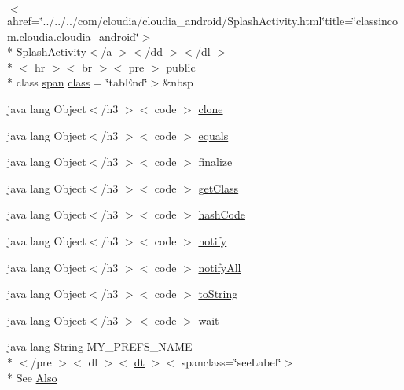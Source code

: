 \begin{DoxyCompactItemize}
$<$ ahref=\char`\"{}../../../com/cloudia/cloudia\-\_\-android/Splash\-Activity.\-html\char`\"{}title=\char`\"{}classincom.\-cloudia.\-cloudia\-\_\-android\char`\"{}$>$\\*
 Splash\-Activity$<$/\hyperlink{style_8css_a5e8981582017bb8b84c21f148345d1f7}{a} $>$$<$/\hyperlink{stylesheet_8css_a47f4718a86835a7771ec592ece845221}{dd} $>$$<$/dl $>$\\*
$<$ hr $>$$<$ br $>$$<$ pre $>$ public \\*
class \hyperlink{stylesheet_8css_a8343996ebcf16220b04e54659aac31cc}{span} \hyperlink{_base_activity_8html_a406f8791460e5753ea2317e76ea0546e}{class} = \char`\"{}tab\-End\char`\"{}$>$\&nbsp
\item 
java lang Object$<$/h3 $>$$<$ code $>$ \hyperlink{_base_activity_8html_adc9607fcabf6f2d7f401ad52015ef6e0}{clone}
\item 
java lang Object$<$/h3 $>$$<$ code $>$ \hyperlink{_base_activity_8html_a8974318cea585f72df717e0380ec7104}{equals}
\item 
java lang Object$<$/h3 $>$$<$ code $>$ \hyperlink{_base_activity_8html_ab2315181ead4aeedef2374039b6ddde7}{finalize}
\item 
java lang Object$<$/h3 $>$$<$ code $>$ \hyperlink{_base_activity_8html_a98e6644727fe65eac217a6855045be43}{get\-Class}
\item 
java lang Object$<$/h3 $>$$<$ code $>$ \hyperlink{_base_activity_8html_a8e178e2bb2bef055ea23ea3910a221ca}{hash\-Code}
\item 
java lang Object$<$/h3 $>$$<$ code $>$ \hyperlink{_base_activity_8html_ae99ae10b5010594dbda4794e02db271b}{notify}
\item 
java lang Object$<$/h3 $>$$<$ code $>$ \hyperlink{_base_activity_8html_a1279357e6e09e33e75b55eb05fdb6436}{notify\-All}
\item 
java lang Object$<$/h3 $>$$<$ code $>$ \hyperlink{_base_activity_8html_a36e8a76a4132c9a7081416f27d087615}{to\-String}
\item 
java lang Object$<$/h3 $>$$<$ code $>$ \hyperlink{_base_activity_8html_a9a9f0c22e5688d478c707f910f1c1aea}{wait}
\item 
java lang String M\-Y\-\_\-\-P\-R\-E\-F\-S\-\_\-\-N\-A\-M\-E\\*
$<$/pre $>$$<$ dl $>$$<$ \hyperlink{stylesheet_8css_a107565fb4039d33b041380d6e0ea1d80}{dt} $>$$<$ spanclass=\char`\"{}see\-Label\char`\"{}$>$\\*
 See \hyperlink{_base_activity_8html_a80d20105dcadc106a59e9ed0152e0caf}{Also}
\end{DoxyCompactItemize}


